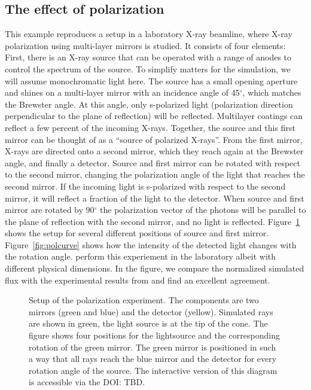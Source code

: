 \documentclass[twocolumn]{aastex61}
\begin{document}
\subsection{The effect of polarization}
This example reproduces a setup in a laboratory X-ray beamline, where
X-ray polarization using multi-layer mirrors is studied. It consists
of four elements: First, there is an X-ray source that can be operated
with a range of anodes to control the spectrum of the source. To
simplify matters for the simulation, we will assume monochromatic
light here. The source has a small opening aperture and shines on a
multi-layer mirror with an incidence angle of 45$^\circ$, which matches the 
Brewster angle. At this angle, only s-polarized light (polarization direction
perpendicular to the plane of reflection) will be
reflected. Multilayer coatings can reflect a few percent of the
incoming X-rays. Together, the source and this first mirror can be
thought of as a ``source of polarized X-rays''. From the first mirror,
X-rays are directed onto a second mirror, which they reach again at the
Brewster angle, and finally a detector. Source and first mirror can be
rotated with respect to the second mirror, changing the
polarization angle of the light that reaches the second mirror. If the
incoming light is s-polarized with respect to the second mirror, it
will reflect a fraction of the light to the detector. When source and
first mirror are rotated by 90$^\circ$ the polarization vector of the
photons will be parallel to the plane of reflection with the second
mirror, and no light is reflected. Figure~\ref{fig:3dpol} shows the
setup for several different positions of source and first
mirror. Figure~\ref{fig:polcurve} shows how the intensity of the
detected light changes with the rotation angle. \citet{2013SPIE.8861E..1DM} perform this experiement in the laboratory albeit with different physical dimensions. In the figure, we compare the normalized simulated flux with the experimental results from \citet{2013SPIE.8861E..1DM} and find an excellent agreement.

\begin{figure}[ht!]
\caption{Setup of the polarization experiment. The components are two
  mirrors (green and blue) and the detector (yellow). Simulated rays
  are shown in green, the light source is at the tip of the cone.
  The figure shows four
  positions for the lightsource and the corresponding rotation of the
  green mirror. The green mirror is positioned in such a way that all
  rays reach the blue mirror and the detector for every rotation angle
  of the source.  The interactive version of this diagram is
  accessible via the DOI: TBD.}
    \label{fig:3dpol}
\end{figure}
\end{document}
